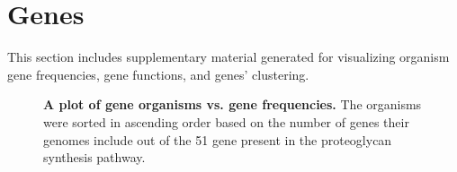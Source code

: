 \documentclass{article}
\begin{document}
\section{Genes}
This section includes supplementary material generated for visualizing organism gene frequencies, gene functions, and genes' clustering.

\begin{figure}[H]
\centering
{}
\caption{\textbf{A plot of gene organisms vs. gene frequencies.} The organisms were sorted in ascending order based on the number of genes their genomes include out of the 51 gene present in the proteoglycan synthesis pathway.}
\label{sup_fig_1}
\end{figure}
\end{document}
